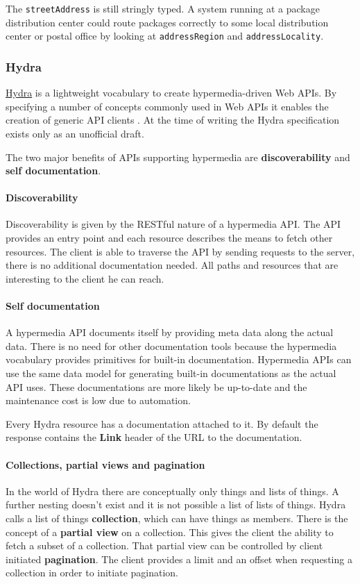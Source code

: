 The \lstinline{streetAddress} is still stringly typed. A system running at a package distribution center could route packages correctly to some local distribution center or postal office by looking at \lstinline{addressRegion} and \lstinline{addressLocality}.

\subsubsection{Hydra}

\href{http://www.hydra-cg.com/}{Hydra} is a lightweight vocabulary to create hypermedia-driven Web APIs. By specifying a number of concepts commonly used in Web APIs it enables the creation of generic API clients \citep{hydasprecs}. At the time of writing the Hydra specification exists only as an unofficial draft.

The two major benefits of APIs supporting hypermedia are \textbf{discoverability} and \textbf{self documentation}. \\
\paragraph{Discoverability} Discoverability is given by the RESTful nature of a hypermedia API. The API provides an entry point and each resource describes the means to fetch other resources. The client is able to traverse the API by sending requests to the server, there is no additional documentation needed. All paths and resources that are interesting to the client he can reach.

\paragraph{Self documentation}
A hypermedia API documents itself by providing meta data along the actual data. There is no need for other documentation tools because the hypermedia vocabulary provides primitives for built-in documentation.
Hypermedia APIs can use the same data model for generating built-in documentations as the actual API uses. These documentations are more likely be up-to-date and the maintenance cost is low due to automation.

Every Hydra resource has a documentation attached to it. By default the response contains the \textbf{Link} header of the URL to the documentation.

\paragraph{Collections, partial views and pagination}
In the world of Hydra there are conceptually only things and lists of things. A further nesting doesn't exist and it is not possible a list of lists of things.
Hydra calls a list of things \textbf{collection}, which can have things as members. There is the concept of a \textbf{partial view} on a collection. This gives the client the ability to fetch a subset of a collection. That partial view can be controlled by client initiated \textbf{pagination}. The client provides a limit and an offset when requesting a collection in order to initiate pagination.

